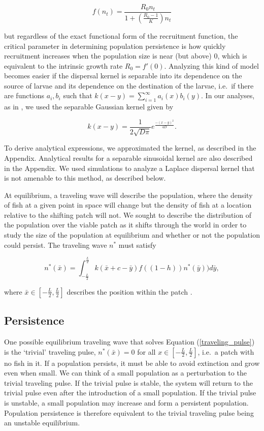 \documentclass[12pt,english]{article}
\begin{document}
\begin{spacing}{1.9}
\begin{flushleft}
\[f(n_t)=\frac{R_0n_t}{1+\left(\frac{R_0-1}{K}\right)n_t}\]  

\noindent but regardless of the exact functional form of the recruitment function, the critical parameter in determining population persistence is how quickly recruitment increases when the population size is near (but above) $0$, which is equivalent to the intrinsic growth rate $R_0=f'(0)$.  Analyzing this kind of model becomes easier if the dispersal kernel is separable into its dependence on the source of larvae and its dependence on the destination of the larvae, i.e.~if there are functions $a_i, b_i$ such that $k(x- y) = \sum^\infty_{i=1} a_i(x)b_i(y)$.  In our analyses, as in \cite{Latore:1998fk}, we used the separable Gaussian kernel given by

\[k(x-y)=\frac{1}{2\sqrt{D\pi}}e^{\frac{-(x-y)^2}{4D}}.\]

\noindent To derive analytical expressions, we approximated the kernel, as described in the Appendix. %
Analytical results for a separable sinusoidal kernel are also described in the Appendix.  %
We used simulations to analyze a Laplace dispersal kernel that is not amenable to this method, as described below.  %

At equilibrium, a traveling wave will describe the population, where the density of fish at a given point in space will change but the density of fish at a location relative to the shifting patch will not. We sought to describe  the distribution of the population over the viable patch as it shifts through the world in order to study the size of the population at equilibrium and whether or not the population could persist. The traveling wave $n^*$ must satisfy

\begin{equation}
n^*(\bar{x})=\int^{\frac{L}{2}}_{-\frac{L}{2}}k(\bar{x}+c-\bar{y})f((1-h))n^*(\bar{y}))d
\bar{y}, \label{traveling_pulse}
\end{equation}

\noindent where $\bar{x}\in\left[-\frac{L}{2}, \frac{L}{2}\right]$ describes the position within the patch \citep{ZhouKot2011}.

\subsection{Persistence }
One possible equilibrium traveling wave that solves Equation (\ref{traveling_pulse}) is the `trivial' traveling pulse, $n^*(\bar{x}) = 0$ for all $x \in \left[-\frac{L}{2}, \frac{L}{2}\right]$, i.e.~a patch with no fish in it.  If a population persists, it must be able to avoid extinction and grow even when small. We can think of a small population as a perturbation to the trivial traveling pulse. If the trivial pulse is stable, the system will return to the trivial pulse even after the introduction of a small population. If the trivial pulse is unstable, a small population may increase and form a persistent population. Population persistence is therefore equivalent to the trivial traveling pulse being an unstable equilibrium.   


\end{flushleft}
\end{spacing}
\end{document}
